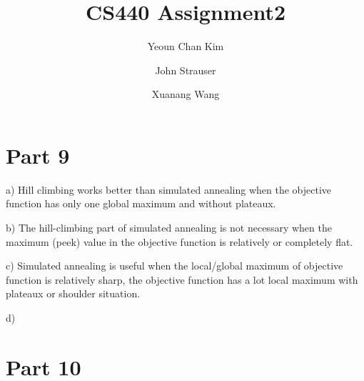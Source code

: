 \documentclass{article}
\author{Yeoun Chan Kim \and John Strauser \and Xuanang Wang}
\title{CS440 Assignment2}
\begin{document}
\maketitle

\section*{Part 9}

\hspace{5mm} 

a) Hill climbing works better than simulated annealing when the objective function has only one global maximum and without plateaux.

b) The hill-climbing part of simulated annealing is not necessary when the maximum (peek) value in the objective function is relatively or completely flat.

c) Simulated annealing is useful when the local/global maximum of objective function is relatively sharp, the objective function has a lot local maximum with plateaux or shoulder situation.

d)

\section*{Part 10}

\end{document}
